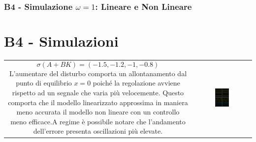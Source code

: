 \documentclass{beamer}
\begin{document}
\begin{frame}
	\frametitle{B4 - Simulazione \(\omega= 1 \): Lineare e Non Lineare}%
	\section{B4 - Simulazioni}%
	\begin{tabular}{cc}
		\begin{minipage}{0.45\textwidth}
			\begin{equation*}
				\sigma(A+BK)=(-1.5,-1.2,-1,-0.8)
			\end{equation*}
			L'aumentare del disturbo comporta un allontanamento dal punto di equilibrio \(x=0\) poiché la regolazione avviene rispetto ad un segnale che varia più velocemente.
			Questo comporta che il modello linearizzato approssima in maniera meno accurata il modello non lineare con un controllo meno efficace.\newline A regime è possibile notare che l'andamento dell'errore presenta oscillazioni più elevate.
		\end{minipage}
		&
		\begin{minipage}{0.45\textwidth}
			\begin{figure}
				\includegraphics[scale=0.55]{2022-06-20-13-25-34.png}%
			\end{figure}
		\end{minipage}
	\end{tabular}
\end{frame}
\end{document}

